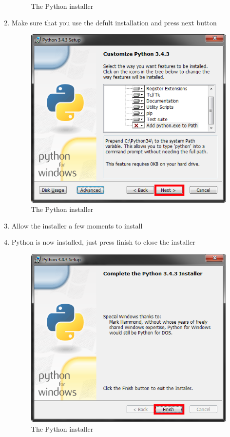 \begin{enumerate}
\begin{figure}[H]
\caption{The Python installer} \label{fig:PyISP5}
\end{figure}
\item Make sure that you use the defult installation and press next button
\begin{figure}[H]
\includegraphics[width=\textwidth]{./Manual/PythonInstall/Part6.png}
\caption{The Python installer} \label{fig:PyISP6}
\end{figure}
\item Allow the installer a few moments to install
\item Python is now installed, just press finish to close the installer
\begin{figure}[H]
\includegraphics[width=\textwidth]{./Manual/PythonInstall/Part7.png}
\caption{The Python installer} \label{fig:PyISP6}
\end{figure}
\end{enumerate}

